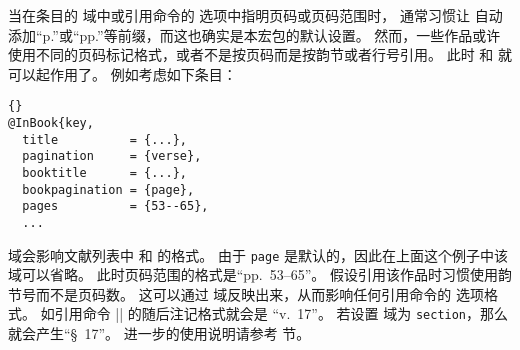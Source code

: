 当在条目的  域中或引用命令的  选项中指明页码或页码范围时，
通常习惯让 \biblatex 自动添加“p.”或“pp.”等前缀，而这也确实是本宏包的默认设置。
然而，一些作品或许使用不同的页码标记格式，或者不是按页码而是按韵节或者行号引用。
此时  和  就可以起作用了。
例如考虑如下条目：

\begin{lstlisting}[style=bibtex]{}
@InBook{key,
  title          = {...},
  pagination     = {verse},
  booktitle      = {...},
  bookpagination = {page},
  pages          = {53--65},
  ...
\end{lstlisting}
%
 域会影响文献列表中   和  的格式。
由于 \texttt{page} 是默认的，因此在上面这个例子中该域可以省略。
此时页码范围的格式是“pp.~53--65”。
假设引用该作品时习惯使用韵节号而不是页码数。
这可以通过  域反映出来，从而影响任何引用命令的  选项格式。
如引用命令 |\cite[17]{key}| 的随后注记格式就会是 “v.~17”。
若设置  域为 \texttt{section}，那么就会产生“\S~17”。
进一步的使用说明请参考  节。


